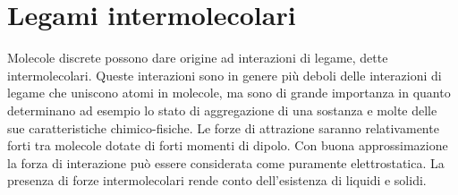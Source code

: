\section{Legami intermolecolari}
Molecole discrete possono dare origine ad interazioni di legame, dette intermolecolari. Queste interazioni sono in genere più deboli delle interazioni di legame che uniscono atomi in molecole, ma sono di grande importanza in quanto determinano ad esempio lo stato di aggregazione di una sostanza e molte delle sue caratteristiche chimico-fisiche. Le forze di attrazione saranno relativamente forti tra molecole dotate di forti momenti di dipolo. Con buona approssimazione la forza di interazione può essere considerata come puramente elettrostatica. La presenza di forze intermolecolari rende conto dell'esistenza di liquidi e solidi.

